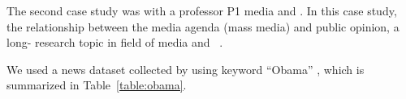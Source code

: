 \begin{table}[b]
	
	\vspace{-3mm}

	\centering
	\caption{
		 of Obama dataset.
	}
	\label{table:obama}	
\end{table}


The second case study was  with a professor \kg{(}P1\kg{)}  media and .
In this case study,  the relationship between the media agenda (mass media) and public opinion,
a long- research topic in  field of media and ~\cite{McCombs1972}.

We used a news dataset collected by using  keyword ``Obama'' , which is summarized in Table~\ref{table:obama}.


